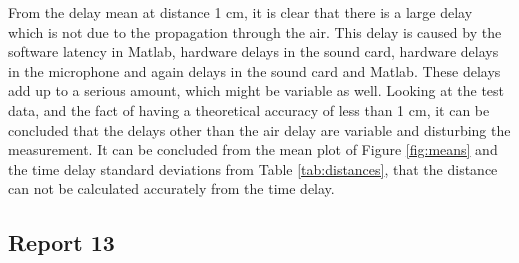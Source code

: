 \documentclass[final]{scrreprt} %
\begin{document}
From the delay mean at distance 1 cm, it is clear that there is a large delay which is not due to the propagation through the air.
This delay is caused by the software latency in Matlab, hardware delays in the sound card, hardware delays in the microphone and again delays in the sound card and Matlab.
These delays add up to a serious amount, which might be variable as well.
Looking at the test data, and the fact of having a theoretical accuracy of less than 1 cm, it can be concluded that the delays other than the air delay are variable and disturbing the measurement.
It can be concluded from the mean plot of Figure \ref{fig:means} and the time delay standard deviations from Table \ref{tab:distances}, that the distance can not be calculated accurately from the time delay.

\subsection{Report 13}
\end{document}
